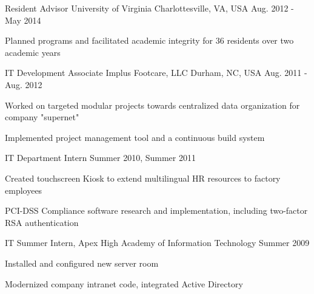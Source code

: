 \begin{cventries}
  \cventry
    {Resident Advisor}
    {University of Virginia}
    {Charlottesville, VA, USA}
    {Aug. 2012 - May 2014}
    {
      \begin{cvitems}
	      \item {Planned programs and facilitated academic integrity for 36 residents over two academic years}
      \end{cvitems}
    }

  \cventry
    {IT Development Associate}
    {Implus Footcare, LLC}
    {Durham, NC, USA}
    {Aug. 2011 - Aug. 2012}
    {
      \begin{cvitems}
        \item Worked on targeted modular projects towards centralized data organization for company "supernet"
        \item Implemented project management tool and a continuous build system
      \end{cvitems}
    }

  \cventry
  {IT Department Intern}
  {}
  {}
  {Summer 2010, Summer 2011}
  {
    \begin{cvitems}
      \item Created touchscreen Kiosk to extend multilingual HR resources to factory employees
      \item PCI-DSS Compliance software research and implementation, including two-factor RSA authentication
    \end{cvitems}
  }

  \cventry
  {IT Summer Intern, Apex High Academy of Information Technology}
  {}
  {}
  {Summer 2009}
  {
    \begin{cvitems}
      \item Installed and configured new server room
      \item Modernized company intranet code, integrated Active Directory
    \end{cvitems}
  }

\end{cventries}
